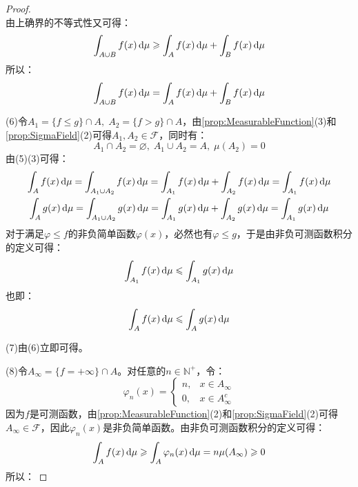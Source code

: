 \begin{proof}
\begin{equation*}
	\end{equation*}
	由上确界的不等式性又可得：
	\begin{equation*}
		\int_{A\cup B}f(x)\mathop{}\!\mathrm{d}\mu\geqslant\int_{A}f(x)\mathop{}\!\mathrm{d}\mu+\int_{B}f(x)\mathop{}\!\mathrm{d}\mu
	\end{equation*}
	所以：
	\begin{equation*}
		\int_{A\cup B}f(x)\mathop{}\!\mathrm{d}\mu=\int_{A}f(x)\mathop{}\!\mathrm{d}\mu+\int_{B}f(x)\mathop{}\!\mathrm{d}\mu
	\end{equation*}\par
	(6)令$A_1=\{f\leqslant g\}\cap A,\;A_2=\{f>g\}\cap A$，由\cref{prop:MeasurableFunction}(3)和\cref{prop:SigmaField}(2)可得$A_1,A_2\in\mathscr{F}$，同时有：
	\begin{equation*}
		A_1\cap A_2=\varnothing,\;A_1\cup A_2=A,\;\mu(A_2)=0
	\end{equation*}
	由(5)(3)可得：
	\begin{gather*}
		\int_{A}f(x)\dif\mu=\int_{A_1\cup A_2}f(x)\dif\mu=\int_{A_1}f(x)\dif\mu+\int_{A_2}f(x)\dif\mu=\int_{A_1}f(x)\dif\mu \\
		\int_{A}g(x)\dif\mu=\int_{A_1\cup A_2}g(x)\dif\mu=\int_{A_1}g(x)\dif\mu+\int_{A_2}g(x)\dif\mu=\int_{A_1}g(x)\dif\mu
	\end{gather*}
	对于满足$\varphi\leqslant f$的非负简单函数$\varphi(x)$，必然也有$\varphi\leqslant g$，于是由非负可测函数积分的定义可得：
	\begin{equation*}
		\int_{A_1}f(x)\mathop{}\!\mathrm{d}\mu\leqslant\int_{A_1}g(x)\mathop{}\!\mathrm{d}\mu
	\end{equation*}
	也即：
	\begin{equation*}
		\int_{A}f(x)\mathop{}\!\mathrm{d}\mu\leqslant\int_{A}g(x)\mathop{}\!\mathrm{d}\mu
	\end{equation*}\par
	(7)由(6)立即可得。\par
	(8)令$A_\infty=\{f=+\infty\}\cap A$。对任意的$n\in\mathbb{N}^+$，令：
	\begin{equation*}
		\varphi_n(x)=
		\begin{cases}
			n,&x\in A_\infty \\
			0,&x\in A_\infty^c
		\end{cases}
	\end{equation*}
	因为$f$是可测函数，由\cref{prop:MeasurableFunction}(2)和\cref{prop:SigmaField}(2)可得$A_\infty\in\mathscr{F}$，因此$\varphi_n(x)$是非负简单函数。由非负可测函数积分的定义可得：
	\begin{equation*}
		\int_{A}f(x)\mathop{}\!\mathrm{d}\mu\geqslant\int_{A}\varphi_n(x)\mathop{}\!\mathrm{d}\mu=n\mu(A_\infty)\geqslant0
	\end{equation*}
	所以：

\end{proof}
